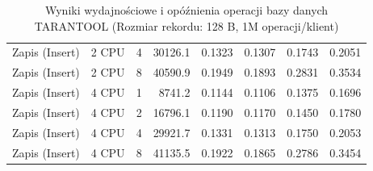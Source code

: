 \begin{table}[ht]
{\begin{tabular}{llcrrrrr}
Zapis (Insert) & 2 CPU & 4 & 30126.1 & 0.1323 & 0.1307 & 0.1743 & 0.2051 \\
Zapis (Insert) & 2 CPU & 8 & 40590.9 & 0.1949 & 0.1893 & 0.2831 & 0.3534 \\
Zapis (Insert) & 4 CPU & 1 & 8741.2 & 0.1144 & 0.1106 & 0.1375 & 0.1696 \\
Zapis (Insert) & 4 CPU & 2 & 16796.1 & 0.1190 & 0.1170 & 0.1450 & 0.1780 \\
Zapis (Insert) & 4 CPU & 4 & 29921.7 & 0.1331 & 0.1313 & 0.1750 & 0.2053 \\
Zapis (Insert) & 4 CPU & 8 & 41135.5 & 0.1922 & 0.1865 & 0.2786 & 0.3454 \\
\bottomrule
\end{tabular}%
}
\caption{Wyniki wydajnościowe i opóźnienia operacji bazy danych TARANTOOL (Rozmiar rekordu: 128 B, 1M operacji/klient)}
\label{tab:latency_tarantool_small_1000000}
\end{table}

